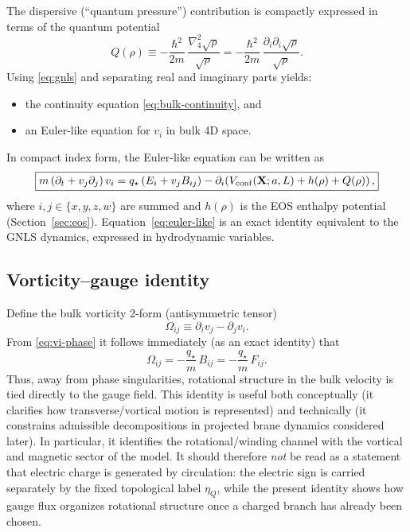\documentclass[11pt]{article}
\newcommand{\etaQ}{\eta_Q}
\newcommand{\qstar}{q_\star}
\begin{document}
The dispersive (``quantum pressure'') contribution is compactly expressed in terms of the quantum potential
\begin{equation}
\boxed{
Q(\rho)
\equiv
-\frac{\hbar^2}{2m}\,\frac{\nabla_4^2\sqrt{\rho}}{\sqrt{\rho}}
=
-\frac{\hbar^2}{2m}\,\frac{\partial_i\partial_i\sqrt{\rho}}{\sqrt{\rho}}.
}
\label{eq:quantum-potential}
\end{equation}
Using \eqref{eq:gnls} and separating real and imaginary parts yields:
\begin{itemize}[leftmargin=2.0em]
\item the continuity equation \eqref{eq:bulk-continuity}, and
\item an Euler-like equation for $v_i$ in bulk 4D space.
\end{itemize}
In compact index form, the Euler-like equation can be written as
\begin{equation}
\boxed{
m\left(\partial_t + v_j\partial_j\right)v_i
=
\qstar\left(E_i + v_j B_{ij}\right)
-
\partial_i\!\left(
V_{\rm conf}(\mathbf{X};a,L)
+
h(\rho)
+
Q(\rho)
\right),
}
\label{eq:euler-like}
\end{equation}
where $i,j\in\{x,y,z,w\}$ are summed and $h(\rho)$ is the EOS enthalpy potential (Section~\ref{sec:eos}). Equation~\eqref{eq:euler-like} is an exact identity equivalent to the GNLS dynamics, expressed in hydrodynamic variables.

\subsection{Vorticity--gauge identity}
\label{sec:eom-vorticity}

Define the bulk vorticity 2-form (antisymmetric tensor)
\begin{equation}
\Omega_{ij}\equiv \partial_i v_j - \partial_j v_i.
\label{eq:vorticity-def}
\end{equation}
From \eqref{eq:vi-phase} it follows immediately (as an exact identity) that
\begin{equation}
\boxed{
\Omega_{ij}
=
-\frac{\qstar}{m}\,B_{ij}
=
-\frac{\qstar}{m}\,F_{ij}.
}
\label{eq:vorticity-gauge}
\end{equation}
Thus, away from phase singularities, rotational structure in the bulk velocity is tied directly to the gauge field. This identity is useful both conceptually (it clarifies how transverse/vortical motion is represented) and technically (it constrains admissible decompositions in projected brane dynamics considered later). In particular, it identifies the rotational/winding channel with the vortical and magnetic sector of the model. It should therefore \emph{not} be read as a statement that electric charge is generated by circulation: the electric sign is carried separately by the fixed topological label $\etaQ$, while the present identity shows how gauge flux organizes rotational structure once a charged branch has already been chosen.
\end{document}
